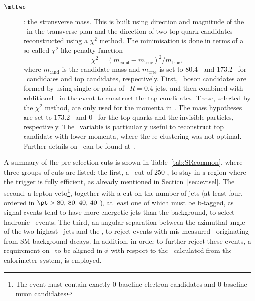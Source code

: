 \begin{description}
				\item[\boldmath $\mttwo$]: the stransverse mass. This is built using direction and magnitude of the \ptmiss\ in the transverse plan and the direction of two top-quark candidates reconstructed using a $\chi^2$ method. The minimisation is done in terms of a so-called $\chi^2$-like penalty function $$\chi^2 = \left(m_{\mathrm{cand}} - m_{\mathrm{true}}\right)^2 / m_{\mathrm{true}},$$ \noindent where $m_{\mathrm{cand}}$ is the candidate mass and $m_{\mathrm{true}}$ is set to $80.4$ \GeV\ and $173.2$ \GeV\ for \Wboson\ candidates and top candidates, respectively. First, \Wboson\ boson candidates are formed by using single or pairs of \antikt\ $R = 0.4$ jets, and then combined with additional \bjs\ in the event to construct the top candidates. These, selected by the $\chi^2$ method, are only used for the momenta in \mttwo. The mass hypotheses are set to $173.2$ \gev\ and $0$ \gev\ for the top quarks and the invisible particles, respectively.	The \mttwo\ variable is particularly useful to reconstruct top candidate with lower momenta, where the re-clustering was not optimal. Further details on \mttwo\ can be found at~\cite{Barr:2003rg, LESTER199999}.

			\end{description}

			A summary of the pre-selection cuts is shown in Table~\ref{tab:SRcommon}, where three groups of cuts are listed: the first, a \met\ cut of $250$ \GeV, to stay in a region where the trigger is fully efficient, as already mentioned in Section~\ref{sec:evtsel}. The second, a lepton veto\footnote{The event must contain exactly $0$ baseline electron candidates and $0$ baseline muon candidates}, together with a cut on the number of jets (at least four, ordered in $\pt > 80,\,80,\,40,\,40$ \GeV), at least one of which must be b-tagged, as signal events tend to have more energetic jets than the background, to select hadronic \ttbar\ events. The third, an angular separation between the azimuthal angle of the two highest-\pt\ jets and the \ptmiss, to reject events with mis-measured \met\ originating from \ac{SM}-background decays. In addition, in order to further reject these events, a requirement on \ptmisstrk\ to be aligned in $\phi$ with respect to the \ptmiss\ calculated from the calorimeter system, is employed. 

